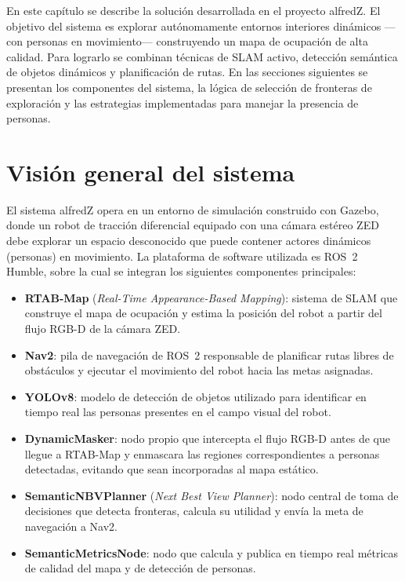 En este capítulo se describe la solución desarrollada en el proyecto alfredZ. El
objetivo del sistema es explorar autónomamente entornos interiores dinámicos
---con personas en movimiento--- construyendo un mapa de ocupación de alta
calidad. Para lograrlo se combinan técnicas de SLAM activo, detección semántica
de objetos dinámicos y planificación de rutas. En las secciones siguientes se
presentan los componentes del sistema, la lógica de selección de fronteras de
exploración y las estrategias implementadas para manejar la presencia de personas.

\section{Visión general del sistema}%
\label{sec:sol_overview}

El sistema alfredZ opera en un entorno de simulación construido con Gazebo,
donde un robot de tracción diferencial equipado con una cámara estéreo ZED
debe explorar un espacio desconocido que puede contener actores dinámicos
(personas) en movimiento. La plataforma de software utilizada es ROS~2 Humble,
sobre la cual se integran los siguientes componentes principales:

\begin{itemize}
    \item \textbf{RTAB-Map} (\textit{Real-Time Appearance-Based Mapping}):
          sistema de SLAM que construye el mapa de ocupación y estima la
          posición del robot a partir del flujo RGB-D de la cámara ZED\@.
    \item \textbf{Nav2}: pila de navegación de ROS~2 responsable de planificar
          rutas libres de obstáculos y ejecutar el movimiento del robot hacia
          las metas asignadas.
    \item \textbf{YOLOv8}: modelo de detección de objetos utilizado para
          identificar en tiempo real las personas presentes en el campo visual
          del robot.
    \item \textbf{DynamicMasker}: nodo propio que intercepta el flujo RGB-D
          antes de que llegue a RTAB-Map y enmascara las regiones
          correspondientes a personas detectadas, evitando que sean incorporadas
          al mapa estático.
    \item \textbf{SemanticNBVPlanner} (\textit{Next Best View Planner}): nodo
          central de toma de decisiones que detecta fronteras, calcula su
          utilidad y envía la meta de navegación a Nav2.
    \item \textbf{SemanticMetricsNode}: nodo que calcula y publica en tiempo
          real métricas de calidad del mapa y de detección de personas.
\end{itemize}

